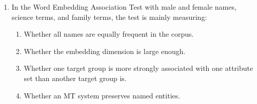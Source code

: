 \documentclass[11pt,a4paper]{article}
\begin{document}
\begin{enumerate}[leftmargin=*]
\begin{enumerate}
\item In the Word Embedding Association Test with male and female names, science terms, and family terms, the test is mainly measuring:
\begin{enumerate}[label=\Alph*.]
\item Whether all names are equally frequent in the corpus.
\item Whether the embedding dimension is large enough.
\item Whether one target group is more strongly associated with one attribute set than another target group is.
\item Whether an MT system preserves named entities.
\end{enumerate}
\end{enumerate}

\end{enumerate}
\end{document}
